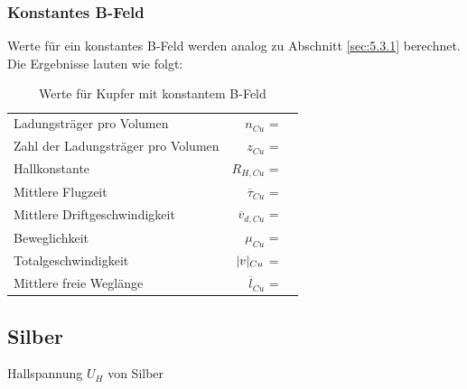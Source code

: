 \subsubsection{Konstantes B-Feld} \label{sec:5.3.2}

\justifying Werte für ein konstantes B-Feld werden analog zu Abschnitt \ref{sec:5.3.1} berechnet. Die Ergebnisse lauten wie folgt:

\begin{table}[H]
\centering
    \begin{tabular}{l r l}
    \toprule
        Ladungsträger pro Volumen               &$n_{Cu}$               = & \text{}  \\
        Zahl der Ladungsträger pro Volumen      &$z_{Cu}$               = & \text{}  \\
        Hallkonstante                           &$R_{H,Cu}$             = & \text{} \\
        Mittlere Flugzeit                       &$\overline{\tau}_{Cu}$ = & \text{}\\
        Mittlere Driftgeschwindigkeit           &$\overline{v}_{d,Cu}$  = & \text{}\\
        Beweglichkeit                           &$\mu_{Cu}$             = & \text{} \\
        Totalgeschwindigkeit                    &$\lvert v\rvert_{Cu}$         = & \text{}  \\
        Mittlere freie Weglänge                 &$\overline{l}_{Cu}$    = & \text{}  \\
        \bottomrule
    \end{tabular}
\caption{Werte für Kupfer mit konstantem B-Feld}
\label{tab:4}
\end{table}

\subsection{Silber} \label{sec:5.4}

\begin{table}[H]
    \centering
    
    \caption{Hallspannung $U_H$ von Silber}
    \label{tab:5}
\end{table}

